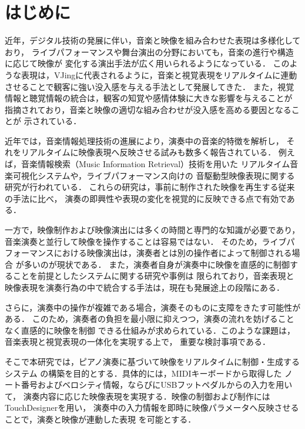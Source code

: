 \section{はじめに}

近年，デジタル技術の発展に伴い，音楽と映像を組み合わせた表現は多様化しており，
ライブパフォーマンスや舞台演出の分野においても，音楽の進行や構造に応じて映像が
変化する演出手法が広く用いられるようになっている．
このような表現は，VJingに代表されるように，音楽と視覚表現をリアルタイムに連動
させることで観客に強い没入感を与える手法として発展してきた\cite{VJingWiki}．
また，視覚情報と聴覚情報の統合は，観客の知覚や感情体験に大きな影響を与えることが
指摘されており，音楽と映像の適切な組み合わせが没入感を高める要因となることが
示されている\cite{asano}．

近年では，音楽情報処理技術の進展により，演奏中の音楽的特徴を解析し，
それをリアルタイムに映像表現へ反映させる試みも数多く報告されている．
例えば，音楽情報検索（Music Information Retrieval）技術を用いた
リアルタイム音楽可視化システムや，ライブパフォーマンス向けの
音駆動型映像表現に関する研究が行われている\cite{graf}．
これらの研究は，事前に制作された映像を再生する従来の手法に比べ，
演奏の即興性や表現の変化を視覚的に反映できる点で有効である．

一方で，映像制作および映像演出には多くの時間と専門的な知識が必要であり，
音楽演奏と並行して映像を操作することは容易ではない．
そのため，ライブパフォーマンスにおける映像演出は，演奏者とは別の操作者によって制御される場合
が多いのが現状である．
また，演奏者自身が演奏中に映像を直感的に制御することを前提としたシステムに関する研究や事例は
限られており，音楽表現と映像表現を演奏行為の中で統合する手法は，現在も発展途上の段階にある．

さらに，演奏中の操作が複雑である場合，演奏そのものに支障をきたす可能性がある．
このため，演奏者の負担を最小限に抑えつつ，演奏の流れを妨げることなく直感的に映像を制御
できる仕組みが求められている．このような課題は，音楽表現と視覚表現の一体化を実現する上で，
重要な検討事項である．

そこで本研究では，ピアノ演奏に基づいて映像をリアルタイムに制御・生成するシステム
の構築を目的とする．具体的には，MIDIキーボードから取得した
ノート番号およびベロシティ情報，ならびにUSBフットペダルからの入力を用いて，
演奏内容に応じた映像表現を実現する．映像の制御および制作にはTouchDesignerを用い，
演奏中の入力情報を即時に映像パラメータへ反映させることで，演奏と映像が連動した表現
を可能とする．


